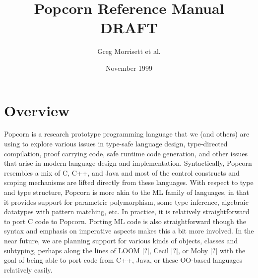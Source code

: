 \documentclass[titlepage,10pt]{article}
\begin{document}
\title{Popcorn Reference Manual \\ \textsc{DRAFT}}
\date{November 1999}
\author{Greg Morrisett et al.}

\maketitle

\tableofcontents

\newpage


\section{Overview\label{overview}}

Popcorn is a research prototype programming language that we (and
others) are using to explore various issues in type-safe language
design, type-directed compilation, proof carrying code, safe runtime
code generation, and other issues that arise in modern language design
and implementation.  Syntactically, Popcorn resembles a mix of C, C++,
and Java and most of the control constructs and scoping mechanisms are
lifted directly from these languages.  With respect to type and type
structure, Popcorn is more akin to the ML family of languages, in that
it provides support for parametric polymorphism, some type inference,
algebraic datatypes with pattern matching, etc.  In practice, it is
relatively straightforward to port C code to Popcorn.   Porting ML code
is also straightforward though the syntax and emphasis on imperative
aspects makes this a bit more involved.  In the near future, we are
planning support for various kinds of objects, classes and subtyping,
perhaps along the lines of LOOM [?], Cecil [?], or Moby [?] with the
goal of being able to port code from C++, Java, or these OO-based
languages relatively easily. 
\end{document}
